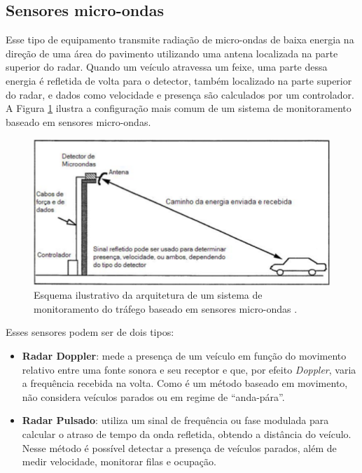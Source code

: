 
\subsection{Sensores micro-ondas} %
\label{sub:radar_por_microondas}

Esse tipo de equipamento transmite radiação de micro-ondas de baixa energia na direção de uma área do pavimento utilizando uma antena localizada na parte superior do radar. Quando um veículo atravessa um feixe, uma parte dessa energia é refletida de volta para o detector, também localizado na parte superior do radar, e dados como velocidade e presença são calculados por um controlador. A Figura \ref{fig:microondas} ilustra a configuração mais comum de um sistema de monitoramento baseado em sensores micro-ondas.

\begin{figure}[ht]
  \begin{center}
    \includegraphics[scale=.6]{imgs/microondas.png}
  \end{center}
  \caption{Esquema ilustrativo da arquitetura de um sistema de monitoramento do tráfego baseado em sensores micro-ondas \citep{goldner:2009:misc}.}
  \label{fig:microondas}
\end{figure}

Esses sensores podem ser de dois tipos:

\begin{itemize}
  \item \textbf{Radar Doppler}: mede a presença de um veículo em função do movimento relativo entre uma fonte sonora e seu receptor e que, por efeito \textit{Doppler}, varia a frequência recebida na volta. Como é um método baseado em movimento, não considera veículos parados ou em regime de ``anda-pára''.
  \item \textbf{Radar Pulsado}: utiliza um sinal de frequência ou fase modulada para calcular o atraso de tempo da onda refletida, obtendo a distância do veículo. Nesse método é possível detectar a presença de veículos parados, além de medir velocidade, monitorar filas e ocupação.
\end{itemize}

